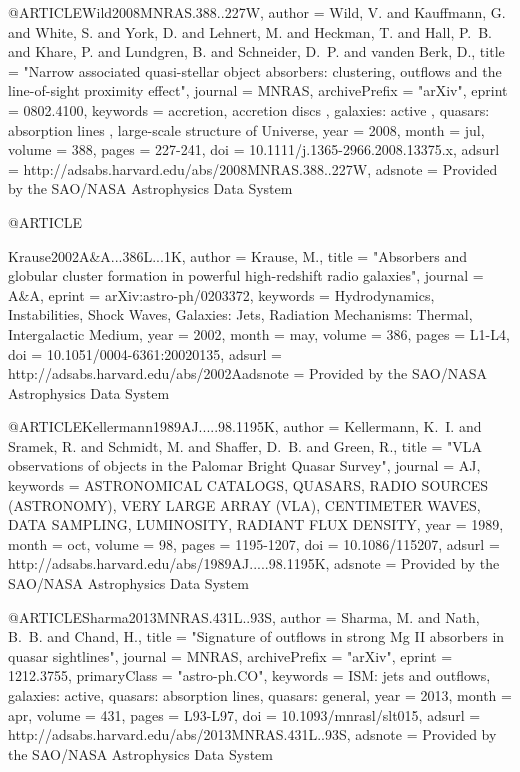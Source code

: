 \documentclass[twocolumn]{aastex62}
\def\aj{{AJ}}\def\actaa{{Acta Astron.}}\def\araa{{ARA\&A}}\def\apj{{ApJ}}\def\apjl{{ApJ}}\def\apjs{{ApJS}}\def\aap{{A\&A}}\def\aapr{{A\&A~Rev.}}\def\aaps{{A\&AS}}\def\apss{{Ap\&SS}}\def\baas{{BAAS}}\def\caa{{Chinese Astron. Astrophys.}}\def\cjaa{{Chinese J. Astron. Astrophys.}}\def\icarus{{Icarus}}\def\jcap{{J. Cosmology Astropart. Phys.}}\def\jrasc{{JRASC}}\def\memras{{MmRAS}}\def\mnras{{MNRAS}}\def\na{{New A}}\def\nar{{New A Rev.}}\def\pra{{Phys.~Rev.~A}}\def\prb{{Phys.~Rev.~B}}\def\prc{{Phys.~Rev.~C}}\def\prd{{Phys.~Rev.~D}}\def\pre{{Phys.~Rev.~E}}\def\prl{{Phys.~Rev.~Lett.}}\def\pasa{{PASA}}\def\pasp{{PASP}}\def\pasj{{PASJ}}
\begin{document}
{{{{{{{{{{{{{{{{@ARTICLE{Wild2008MNRAS.388..227W,
   author = {{Wild}, V. and {Kauffmann}, G. and {White}, S. and {York}, D. and 
	{Lehnert}, M. and {Heckman}, T. and {Hall}, P.~B. and {Khare}, P. and 
	{Lundgren}, B. and {Schneider}, D.~P. and {vanden Berk}, D.},
    title = "{Narrow associated quasi-stellar object absorbers: clustering, outflows and the line-of-sight proximity effect}",
  journal = {\mnras},
archivePrefix = "arXiv",
   eprint = {0802.4100},
 keywords = {accretion, accretion discs , galaxies: active , quasars: absorption lines , large-scale structure of Universe},
     year = 2008,
    month = jul,
   volume = 388,
    pages = {227-241},
      doi = {10.1111/j.1365-2966.2008.13375.x},
   adsurl = {http://adsabs.harvard.edu/abs/2008MNRAS.388..227W},
  adsnote = {Provided by the SAO/NASA Astrophysics Data System}
}



@ARTICLE{Krause2002A&A...386L...1K,
   author = {{Krause}, M.},
    title = "{Absorbers and globular cluster formation in powerful high-redshift radio galaxies}",
  journal = {\aap},
   eprint = {arXiv:astro-ph/0203372},
 keywords = {Hydrodynamics, Instabilities, Shock Waves, Galaxies: Jets, Radiation Mechanisms: Thermal, Intergalactic Medium},
     year = 2002,
    month = may,
   volume = 386,
    pages = {L1-L4},
      doi = {10.1051/0004-6361:20020135},
   adsurl = {http://adsabs.harvard.edu/abs/2002Aadsnote = {Provided by the SAO/NASA Astrophysics Data System}
}

@ARTICLE{Kellermann1989AJ.....98.1195K,
   author = {{Kellermann}, K.~I. and {Sramek}, R. and {Schmidt}, M. and {Shaffer}, D.~B. and 
	{Green}, R.},
    title = "{VLA observations of objects in the Palomar Bright Quasar Survey}",
  journal = {\aj},
 keywords = {ASTRONOMICAL CATALOGS, QUASARS, RADIO SOURCES (ASTRONOMY), VERY LARGE ARRAY (VLA), CENTIMETER WAVES, DATA SAMPLING, LUMINOSITY, RADIANT FLUX DENSITY},
     year = 1989,
    month = oct,
   volume = 98,
    pages = {1195-1207},
      doi = {10.1086/115207},
   adsurl = {http://adsabs.harvard.edu/abs/1989AJ.....98.1195K},
  adsnote = {Provided by the SAO/NASA Astrophysics Data System}
}

@ARTICLE{Sharma2013MNRAS.431L..93S,
   author = {{Sharma}, M. and {Nath}, B.~B. and {Chand}, H.},
    title = "{Signature of outflows in strong Mg II absorbers in quasar sightlines}",
  journal = {\mnras},
archivePrefix = "arXiv",
   eprint = {1212.3755},
 primaryClass = "astro-ph.CO",
 keywords = {ISM: jets and outflows, galaxies: active, quasars: absorption lines, quasars: general},
     year = 2013,
    month = apr,
   volume = 431,
    pages = {L93-L97},
      doi = {10.1093/mnrasl/slt015},
   adsurl = {http://adsabs.harvard.edu/abs/2013MNRAS.431L..93S},
  adsnote = {Provided by the SAO/NASA Astrophysics Data System}
}

}}}}}}}}}}}}}}}}}
\end{document}
